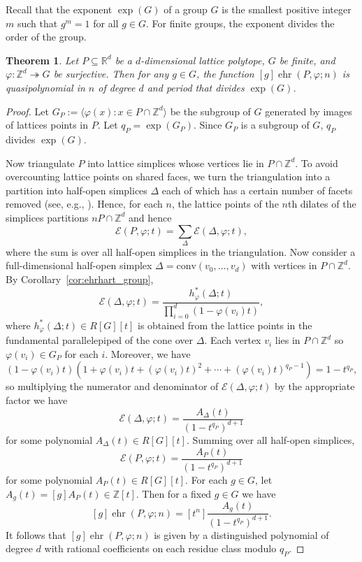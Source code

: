 \documentclass[12pt,reqno]{amsart}
\newtheorem{thm}{Theorem}[section]
\theoremstyle{definition}
\theoremstyle{remark}
\newcommand{\conv}{\mathrm{conv}}
\newcommand{\R}{\mathbb{R}}
\newcommand{\Z}{\mathbb{Z}}
\renewcommand{\phi}{\varphi}
\DeclareMathOperator{\ehr}{ehr}
\begin{document}
Recall that the exponent $\exp(G)$ of a group $G$ is the smallest positive integer $m$ such that $g^m=1$ for all $g \in G$.  For finite groups, the exponent divides the order of the group.

\begin{thm}\label{thm:quasipolynomial}
Let $P \subseteq \R^d$ be a $d$-dimensional lattice polytope, $G$ be finite, and $\varphi:\Z^d \twoheadrightarrow G$ be surjective. Then for any $g \in G$, the function $[g]\ehr(P,\varphi;n)$ is quasipolynomial in $n$ of degree $d$ and period that divides $\exp(G)$.
\end{thm}
\begin{proof} 
Let $G_P:=\langle \phi(x) \colon x \in P \cap \Z^d \rangle$ be the subgroup of $G$ generated by images of lattices points in $P$. Let $q_P = \exp(G_P)$. Since $G_P$ is a subgroup of $G$, $q_P$ divides $\exp(G)$. 

Now triangulate $P$ into lattice simplices whose vertices lie in $P \cap \Z^d$. To avoid overcounting lattice points on shared faces, we turn the triangulation into a partition into half-open simplices $\Delta$ each of which has a certain number of facets removed (see, e.g., \cite{StanleyDecompositions}). 
Hence, for each $n$, the lattice points of the $n$th dilates of the simplices partitions $nP \cap \Z^d$ and hence
\[
\mathcal{E}(P,\varphi;t)=\sum_{\Delta} \mathcal{E}(\Delta,\varphi;t),
\]
where the sum is over all half-open simplices in the triangulation. Now consider a full-dimensional half-open simplex $\Delta=\conv(v_0,\ldots,v_d)$ with vertices in $P \cap \Z^d$. By Corollary~\ref{cor:ehrhart_group},
\[
\mathcal{E}(\Delta,\varphi;t) = \frac{h^*_{\varphi}(\Delta;t)}{\prod_{i=0}^d (1-\phi(v_i)t)},
\]
where $h^*_{\varphi}(\Delta;t) \in R[G][t]$ is obtained from the lattice points in the fundamental parallelepiped of the cone over $\Delta$. Each vertex $v_i$ lies in $P \cap \Z^d$ so $\phi(v_i) \in G_P$ for each $i$. Moreover, we have
\[
(1-\phi(v_i)t)(1+\phi(v_i)t+(\phi(v_i)t)^2+\cdots+(\phi(v_i)t)^{q_P-1}) = 1-t^{q_P},
\]
so multiplying the numerator and denominator of $\mathcal{E}(\Delta,\varphi;t)$ by the appropriate factor we have
\[
\mathcal{E}(\Delta,\varphi;t) = \frac{A_{\Delta}(t)}{(1-t^{q_P})^{d+1}}
\]
for some polynomial $A_{\Delta}(t) \in R[G][t]$. Summing over all half-open simplices,
\[
\mathcal{E}(P,\phi;t)=\frac{A_P(t)}{(1-t^{q_P})^{d+1}}
\]
for some polynomial $A_P(t) \in R[G][t]$. For each $g \in G$, let $A_g(t)=[g]A_P(t) \in \Z[t]$. Then for a fixed $g \in G$ we have
\[
[g]\ehr(P,\varphi;n)=[t^n] \frac{A_g(t)}{(1-t^{q_P})^{d+1}}.
\]
It follows that $[g]\ehr(P,\varphi;n)$ is given by a distinguished polynomial of degree $d$ with rational coefficients on each residue class modulo $q_P$.
\end{proof}
\end{document}

